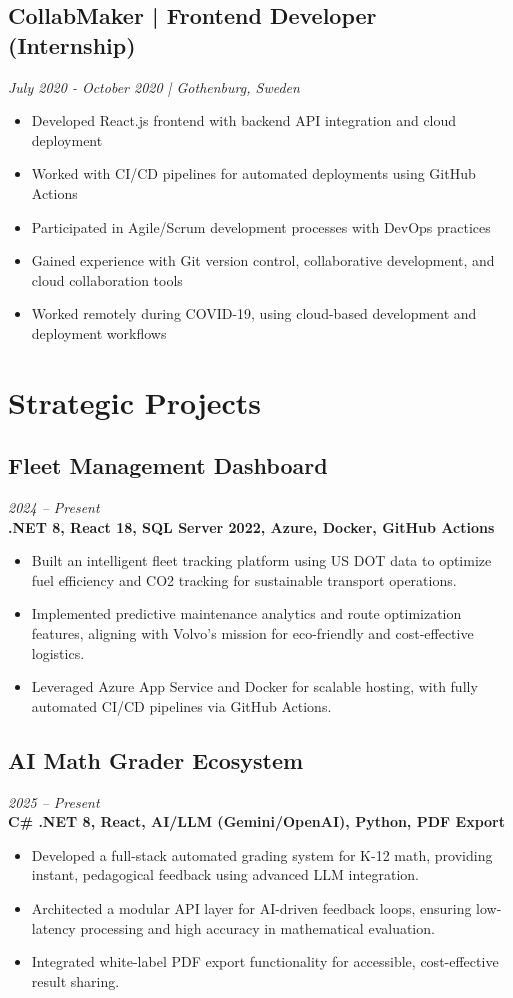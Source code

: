 \documentclass[11pt,a4paper]{article}
\begin{document}
\subsection*{CollabMaker | Frontend Developer (Internship)}
\textit{July 2020 - October 2020 | Gothenburg, Sweden}
\begin{itemize}[noitemsep]
\item Developed React.js frontend with backend API integration and cloud deployment
\item Worked with CI/CD pipelines for automated deployments using GitHub Actions
\item Participated in Agile/Scrum development processes with DevOps practices
\item Gained experience with Git version control, collaborative development, and cloud collaboration tools
\item Worked remotely during COVID-19, using cloud-based development and deployment workflows
\end{itemize}

\section*{Strategic Projects}
\subsection{Fleet Management Dashboard}
\textit{2024 -- Present} \\
\textbf{.NET 8, React 18, SQL Server 2022, Azure, Docker, GitHub Actions}
\begin{itemize}
\item Built an intelligent fleet tracking platform using US DOT data to optimize fuel efficiency and CO2 tracking for sustainable transport operations.
\item Implemented predictive maintenance analytics and route optimization features, aligning with Volvo's mission for eco-friendly and cost-effective logistics.
\item Leveraged Azure App Service and Docker for scalable hosting, with fully automated CI/CD pipelines via GitHub Actions.
\end{itemize}

\subsection{AI Math Grader Ecosystem}
\textit{2025 -- Present} \\
\textbf{C\# .NET 8, React, AI/LLM (Gemini/OpenAI), Python, PDF Export}
\begin{itemize}
\item Developed a full-stack automated grading system for K-12 math, providing instant, pedagogical feedback using advanced LLM integration.
\item Architected a modular API layer for AI-driven feedback loops, ensuring low-latency processing and high accuracy in mathematical evaluation.
\item Integrated white-label PDF export functionality for accessible, cost-effective result sharing.
\end{itemize}
\end{document}

